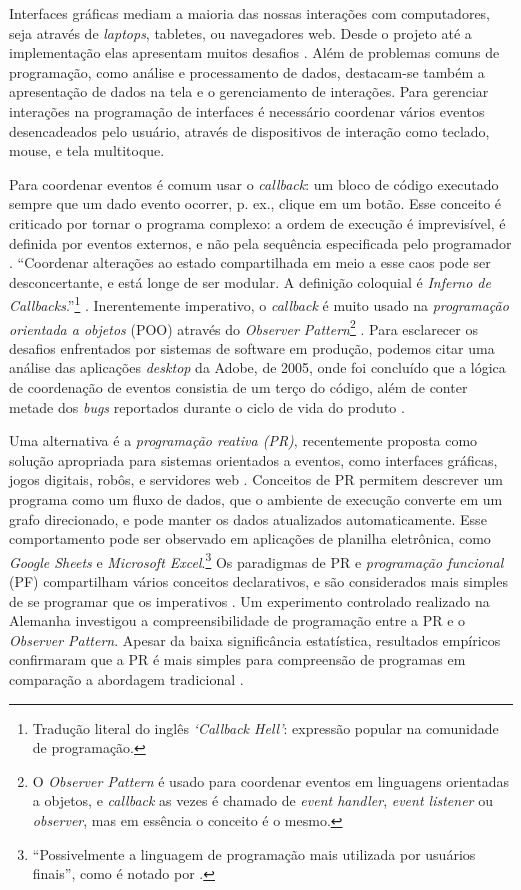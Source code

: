 Interfaces gráficas mediam a maioria das nossas interações com computadores,
seja através de \emph{laptops}, tabletes, ou navegadores web.
Desde o projeto até a implementação elas apresentam muitos desafios
\cite{myers1994}.
Além de problemas comuns de programação, como análise e processamento de dados,
destacam-se também a apresentação de dados na tela e o gerenciamento de
interações.
Para gerenciar interações na programação de interfaces é necessário coordenar
vários eventos desencadeados pelo usuário, através de dispositivos de interação
como teclado, mouse, e tela multitoque.

Para coordenar eventos é comum usar o \emph{callback}: um bloco de código executado
sempre que um dado evento ocorrer, p. ex., clique em um botão.
Esse conceito é criticado por tornar o programa complexo: a ordem de execução é
imprevisível, é definida por eventos externos, e não pela sequência especificada
pelo programador \cite{maier2010,edwards2009,fischer2007}.
“Coordenar alterações ao estado compartilhada em meio a esse caos pode ser
desconcertante, e está longe de ser modular. A definição coloquial é \emph{Inferno de
Callbacks}.”\footnote{Tradução literal do inglês \emph{‘Callback Hell’}: expressão
popular na comunidade de programação.} \cite[p. 2; tradução nossa]{edwards2009}.
Inerentemente imperativo, o \emph{callback} é muito usado na \emph{programação orientada a
objetos} (POO) através do \emph{Observer Pattern}\footnote{O \emph{Observer Pattern} é usado para coordenar eventos em
linguagens orientadas a objetos, e \emph{callback} as vezes é chamado de \emph{event
handler}, \emph{event listener} ou \emph{observer}, mas em essência o conceito é o mesmo.}
\cite{blackheath2016,maier2010}.
Para esclarecer os desafios enfrentados por sistemas de software em produção,
podemos citar uma análise das aplicações \emph{desktop} da Adobe, de 2005, onde foi
concluído que a lógica de coordenação de eventos consistia de um terço do
código, além de conter metade dos \emph{bugs} reportados durante o ciclo de vida do
produto \cite{jarvi2008}.

Uma alternativa é a \emph{programação reativa (PR)}, recentemente proposta como
solução apropriada para sistemas orientados a eventos, como interfaces gráficas,
jogos digitais, robôs, e servidores web \cite{salvaneschi2015,bainomugisha2013}.
Conceitos de PR permitem descrever um programa como um fluxo de dados, que o
ambiente de execução converte em um grafo direcionado, e pode manter os dados
atualizados automaticamente.
Esse comportamento pode ser observado em aplicações de planilha eletrônica, como
\emph{Google Sheets} e \emph{Microsoft Excel}.\footnote{“Possivelmente a linguagem de programação mais utilizada por
usuários finais”, como é notado por \textcite[p. 2]{bainomugisha2013}.}
Os paradigmas de PR e \emph{programação funcional} (PF) compartilham vários conceitos
declarativos, e são considerados mais simples de se programar que os imperativos
\cite{blackheath2016,bainomugisha2013}.
Um experimento controlado realizado na Alemanha investigou a compreensibilidade
de programação entre a PR e o \emph{Observer Pattern}.
Apesar da baixa significância estatística, resultados empíricos confirmaram que
a PR é mais simples para compreensão de programas em comparação a abordagem
tradicional \cite{salvaneschi2014}.

